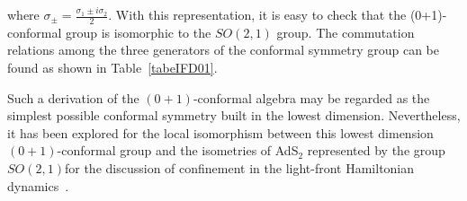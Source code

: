\documentclass[%
 reprint,
superscriptaddress,
 amsmath,amssymb,
 aps,
]{revtex4-2}
\begin{document}
where $\sigma_{\pm}=\frac{\sigma_{1}\pm i\sigma_{2}}{2}$. With this representation, it is easy to check that the (0+1)-conformal group is isomorphic to the $SO(2,1)$ group. The commutation relations among the three generators of the conformal symmetry group can be found as shown in Table~\ref{tabeIFD01}.  
%
\begin{table}[h!]
\centering
\caption{\label{tabeIFD01}$0+1$ conformal algebra in IFD}
\end{table}
Such a derivation of the $(0+1)$-conformal algebra may be regarded as the simplest possible conformal symmetry built in the lowest dimension. Nevertheless, it has been explored for the local isomorphism between this lowest dimension $(0+1)$-conformal group and the isometries of AdS$_2$ represented by the group $SO(2, 1) $for the discussion of confinement in the light-front Hamiltonian dynamics~\cite{Brodsky_2015}.  
\end{document}
